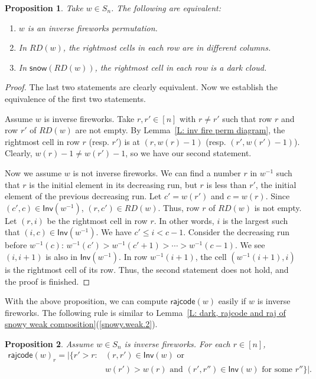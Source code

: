 \documentclass[10pt]{amsart}
\theoremstyle{plain}
\theoremstyle{plain}
\theoremstyle{definition}
\theoremstyle{definition}
\theoremstyle{definition}
\theoremstyle{plain}
\theoremstyle{plain}
\theoremstyle{plain}
\theoremstyle{plain}
\newtheorem{prop}[prop]{Proposition}
\theoremstyle{plain}
\theoremstyle{remark}
\theoremstyle{remark}
\theoremstyle{plain}
\theoremstyle{plain}
\newcommand{\snow}{\mathsf{snow}}
\newcommand{\rajcode}{\mathsf{rajcode}}
\newcommand{\Inv}{\mathsf{Inv}}
\begin{document}
\begin{prop}
Take $w \in S_n$.
The following are equivalent:
\begin{enumerate}
\item $w$ is an inverse fireworks permutation.
\item In $RD(w)$, the rightmost cells in each row 
are in different columns. 
\item In $\snow(RD(w))$, 
the rightmost cell in each row is a dark cloud. 
\end{enumerate}
\end{prop}
\begin{proof}
The last two statements are clearly equivalent. 
Now we establish the equivalence of 
the first two statements.

Assume $w$ is inverse fireworks.
Take $r, r' \in [n]$ with $r \neq r'$
such that row $r$ and row $r'$ of $RD(w)$
are not empty.
By Lemma~\ref{L: inv fire perm diagram},
the rightmost cell in row $r$ 
(resp. $r'$)
is at $(r, w(r) - 1)$ 
(resp. $(r', w(r') - 1)$).
Clearly, $w(r) - 1 \neq w(r') - 1$,
so we have our second statement. 

Now we assume $w$ is not inverse fireworks.
We can find a number $r$ in $w^{-1}$
such that $r$ is the initial element in
its decreasing run, 
but $r$ is less than $r'$, 
the initial element of the 
previous decreasing run. 
Let $c' = w(r')$ and $c = w(r)$.
Since $(c', c) \in \Inv(w^{-1})$, 
$(r, c') \in RD(w)$.
Thus, row $r$ of $RD(w)$ is not empty.
Let $(r, i)$ be the rightmost cell
in row $r$.
In other words, $i$ is the largest
such that $(i, c) \in \Inv(w^{-1})$.
We have $c' \leqslant i < c - 1$.
Consider the decreasing run before $w^{-1}(c)$:
$w^{-1}(c') > w^{-1}(c' + 1) > \cdots > w^{-1}(c - 1)$.
We see $(i, i+1)$ is also in $\Inv(w^{-1})$.
In row $w^{-1}(i+1)$, 
the cell $(w^{-1}(i+1), i)$ is the 
rightmost cell of its row.
Thus, the second statement does not hold,
and the proof is finished. 
\end{proof}

With the above proposition, we can compute $\rajcode(w)$ easily
if $w$ is inverse fireworks.
The following rule is similar to Lemma~\ref{L: dark, rajcode and raj of snowy weak composition}(\ref{snowy.weak.2}).

\begin{prop}
Assume $w \in S_n$ is inverse fireworks.
For each $r \in [n]$,
\begin{align*}
\rajcode(w)_r = |\{r' > r: &(r,r') \in \Inv(w) \textrm{ or }\\
&w(r') > w(r)\textrm{ and }(r', r'') \in \Inv(w) \textrm{ for some } r''\}|.
\end{align*}
\end{prop}
\end{document}
